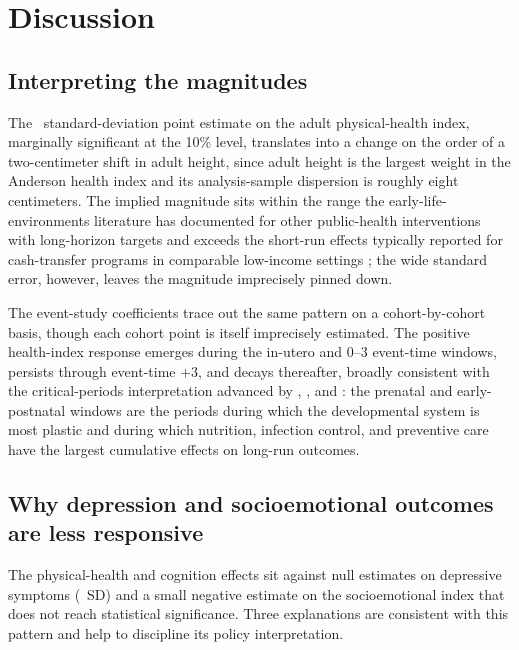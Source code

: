 
\section{Discussion} \label{sec:discussion}

\subsection{Interpreting the magnitudes}

The \CoefHealthCS~standard-deviation point estimate on the adult physical-health index, marginally significant at the 10\% level, translates into a change on the order of a two-centimeter shift in adult height, since adult height is the largest weight in the Anderson health index and its analysis-sample dispersion is roughly eight centimeters. The implied magnitude sits within the range the early-life-environments literature has documented for other public-health interventions with long-horizon targets \autocite{duflo2001,maccini2009,majid2015,ahsan2021} and exceeds the short-run effects typically reported for cash-transfer programs in comparable low-income settings \autocite{premand2022}; the wide standard error, however, leaves the magnitude imprecisely pinned down.

The event-study coefficients trace out the same pattern on a cohort-by-cohort basis, though each cohort point is itself imprecisely estimated. The positive health-index response emerges during the in-utero and 0--3 event-time windows, persists through event-time $+3$, and decays thereafter, broadly consistent with the critical-periods interpretation advanced by \textcite{barker1995}, \textcite{duflo2001}, and \textcite{maccini2009}: the prenatal and early-postnatal windows are the periods during which the developmental system is most plastic and during which nutrition, infection control, and preventive care have the largest cumulative effects on long-run outcomes.

\subsection{Why depression and socioemotional outcomes are less responsive}

The physical-health and cognition effects sit against null estimates on depressive symptoms (\CoefDepCS~SD) and a small negative estimate on the socioemotional index that does not reach statistical significance. Three explanations are consistent with this pattern and help to discipline its policy interpretation.

